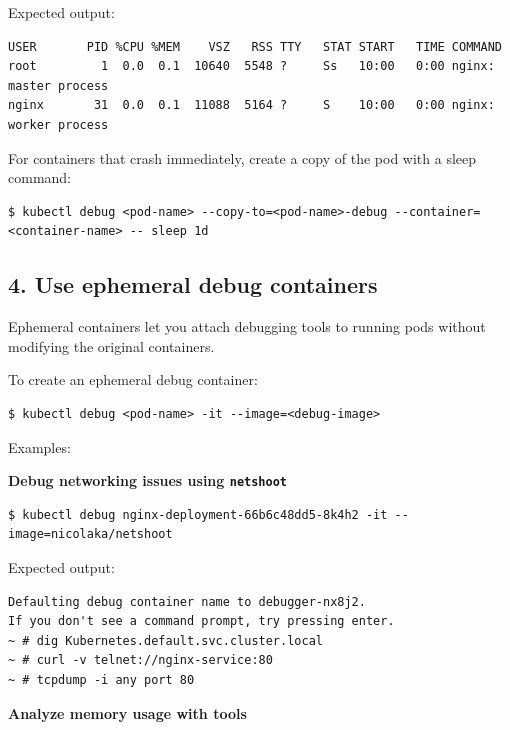 \documentclass{article}
\begin{document}
Expected output:

\begin{lstlisting}[style=bash]
USER       PID %CPU %MEM    VSZ   RSS TTY   STAT START   TIME COMMAND
root         1  0.0  0.1  10640  5548 ?     Ss   10:00   0:00 nginx: master process
nginx       31  0.0  0.1  11088  5164 ?     S    10:00   0:00 nginx: worker process
\end{lstlisting}

\begin{tcolorbox}[colback=green!5!white,colframe=green!75!black,title=Tip]
For containers that crash immediately, create a copy of the pod with a sleep command:

\begin{lstlisting}[style=bash]
$ kubectl debug <pod-name> --copy-to=<pod-name>-debug --container=<container-name> -- sleep 1d
\end{lstlisting}
\end{tcolorbox}

\subsection*{4. Use ephemeral debug containers}

Ephemeral containers let you attach debugging tools to running pods without modifying the original containers.

To create an ephemeral debug container:

\begin{lstlisting}[style=bash]
$ kubectl debug <pod-name> -it --image=<debug-image>
\end{lstlisting}

Examples:

\textbf{Debug networking issues using \texttt{netshoot}}

\begin{lstlisting}[style=bash]
$ kubectl debug nginx-deployment-66b6c48dd5-8k4h2 -it --image=nicolaka/netshoot
\end{lstlisting}

Expected output:

\begin{lstlisting}[style=bash]
Defaulting debug container name to debugger-nx8j2.
If you don't see a command prompt, try pressing enter.
~ # dig Kubernetes.default.svc.cluster.local
~ # curl -v telnet://nginx-service:80
~ # tcpdump -i any port 80
\end{lstlisting}

\textbf{Analyze memory usage with tools}
\end{document}
